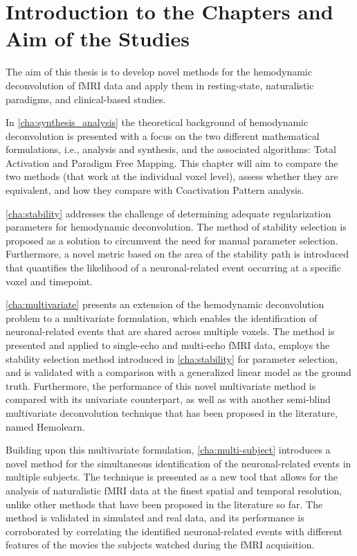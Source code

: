 \section{Introduction to the Chapters and Aim of the Studies}

The aim of this thesis is to develop novel methods for the hemodynamic
deconvolution of fMRI data and apply them in resting-state, naturalistic
paradigms, and clinical-based studies. 

In \cref{cha:synthesis_analysis} the theoretical background of hemodynamic
deconvolution is presented with a focus on the two different mathematical
formulations, i.e., analysis and synthesis, and the associated algorithms: Total
Activation and Paradigm Free Mapping. This chapter will aim to compare the two methods
(that work at the individual voxel level), assess whether they are equivalent,
and how they compare with Coactivation Pattern analysis.

\cref{cha:stability} addresses the challenge of determining adequate
regularization parameters for hemodynamic deconvolution. The method of stability
selection is proposed as a solution to circumvent the need for manual parameter
selection. Furthermore, a novel metric based on the area of the stability path
is introduced that quantifies the likelihood of a neuronal-related event
occurring at a specific voxel and timepoint.

\cref{cha:multivariate} presents an extension of the hemodynamic deconvolution
problem to a multivariate formulation, which enables the identification of
neuronal-related events that are shared across multiple voxels. The method is
presented and applied to single-echo and multi-echo fMRI data, employs the
stability selection method introduced in \cref{cha:stability} for parameter
selection, and is validated with a comparison with a generalized linear model as
the ground truth. Furthermore, the performance of this novel multivariate method
is compared with its univariate counterpart, as well as with another semi-blind
multivariate deconvolution technique that has been proposed in the literature,
named Hemolearn.

Building upon this multivariate formulation, \cref{cha:multi-subject} introduces
a novel method for the simultaneous identification of the neuronal-related
events in multiple subjects. The technique is presented as a new tool that
allows for the analysis of naturalistic fMRI data at the finest spatial and
temporal resolution, unlike other methods that have been proposed in the
literature so far. The method is validated in simulated and real data, and its
performance is corroborated by correlating the identified neuronal-related
events with different features of the movies the subjects watched during the
fMRI acquisition.

